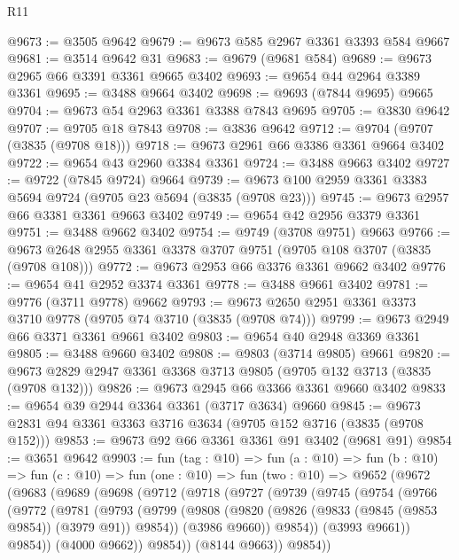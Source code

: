 \begin{lexlean}{R11}
\begin{coremodule}
@9673 := @3505 @9642
@9679 := @9673 @585 @2967 @3361 @3393 @584 @9667
@9681 := @3514 @9642 @31
@9683 := @9679 (@9681 @584)
@9689 := @9673 @2965 @66 @3391 @3361 @9665 @3402
@9693 := @9654 @44 @2964 @3389 @3361
@9695 := @3488 @9664 @3402
@9698 := @9693 (@7844 @9695) @9665
@9704 := @9673 @54 @2963 @3361 @3388 @7843 @9695
@9705 := @3830 @9642
@9707 := @9705 @18 @7843
@9708 := @3836 @9642
@9712 := @9704 (@9707 (@3835 (@9708 @18)))
@9718 := @9673 @2961 @66 @3386 @3361 @9664 @3402
@9722 := @9654 @43 @2960 @3384 @3361
@9724 := @3488 @9663 @3402
@9727 := @9722 (@7845 @9724) @9664
@9739 := @9673 @100 @2959 @3361 @3383 @5694 @9724 (@9705 @23 @5694 (@3835 (@9708 @23)))
@9745 := @9673 @2957 @66 @3381 @3361 @9663 @3402
@9749 := @9654 @42 @2956 @3379 @3361
@9751 := @3488 @9662 @3402
@9754 := @9749 (@3708 @9751) @9663
@9766 := @9673 @2648 @2955 @3361 @3378 @3707 @9751 (@9705 @108 @3707 (@3835 (@9708 @108)))
@9772 := @9673 @2953 @66 @3376 @3361 @9662 @3402
@9776 := @9654 @41 @2952 @3374 @3361
@9778 := @3488 @9661 @3402
@9781 := @9776 (@3711 @9778) @9662
@9793 := @9673 @2650 @2951 @3361 @3373 @3710 @9778 (@9705 @74 @3710 (@3835 (@9708 @74)))
@9799 := @9673 @2949 @66 @3371 @3361 @9661 @3402
@9803 := @9654 @40 @2948 @3369 @3361
@9805 := @3488 @9660 @3402
@9808 := @9803 (@3714 @9805) @9661
@9820 := @9673 @2829 @2947 @3361 @3368 @3713 @9805 (@9705 @132 @3713 (@3835 (@9708 @132)))
@9826 := @9673 @2945 @66 @3366 @3361 @9660 @3402
@9833 := @9654 @39 @2944 @3364 @3361 (@3717 @3634) @9660
@9845 := @9673 @2831 @94 @3361 @3363 @3716 @3634 (@9705 @152 @3716 (@3835 (@9708 @152)))
@9853 := @9673 @92 @66 @3361 @3361 @91 @3402 (@9681 @91)
@9854 := @3651 @9642
@9903 := fun (tag : @10) =>
  fun (a : @10) =>
  fun (b : @10) =>
  fun (c : @10) =>
  fun (one : @10) =>
  fun (two : @10) =>
  @9652
    (@9672
      (@9683
        (@9689
          (@9698
            (@9712
              (@9718
                (@9727
                  (@9739
                    (@9745
                      (@9754
                        (@9766
                          (@9772
                            (@9781
                              (@9793
                                (@9799
                                  (@9808
                                    (@9820 (@9826 (@9833 (@9845 (@9853 @9854)) (@3979 @91)) @9854))
                                    (@3986 @9660))
                                  @9854))
                              (@3993 @9661))
                            @9854))
                        (@4000 @9662))
                      @9854))
                  (@8144 @9663))
                @9854))

\end{coremodule}
\end{lexlean}
